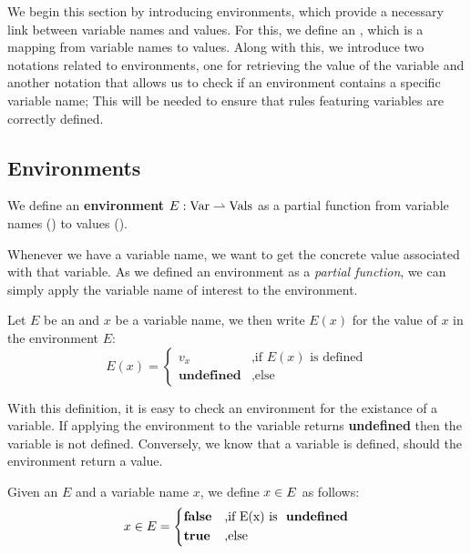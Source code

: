 We begin this section by introducing environments, which provide a necessary link between variable names and values. For this, we define an , which is a mapping from variable names to values. Along with this, we introduce two notations related to environments, one for retrieving the value of the variable and another notation that allows us to check if an environment contains a specific variable name; This will be needed to ensure that rules featuring variables are correctly defined.

\subsection{Environments}

\begin{definition}[Environment]\label{def:environment}
   We define an \textbf{environment} \(E: \text{\Var} \partialto \text{\Vals}\) as a partial function from variable names (\Var) to values (\Vals). 
\end{definition}

Whenever we have a variable name, we want to get the concrete value associated with that variable. As we defined an environment as a \emph{partial function}, we can simply apply the variable name of interest to the environment.

\begin{definition}\label{def:environment-getter}	
   Let \(E\) be an  and \(x\) be a variable name, we then write \(E(x)\) for the value of \(x\) in the environment \(E\):
   \[
      E(x) =
      \begin{cases}
	 v_x		    & \mbox{,if } E(x) \text{ is defined} \\
	 \textbf{undefined} &\mbox{,else}
      \end{cases}
   \]
\end{definition}

With this definition, it is easy to check an environment for the existance of a variable. If applying the environment to the variable returns \textbf{undefined} then the variable is not defined. Conversely, we know that a variable is defined, should the environment return a value.

\begin{definition}\label{def:in-environment}
   Given an  \(E\) and a variable name \(x\), we define \(\contains{E}{x}\) as follows:
   \[
      \contains{E}{x} = 
      \begin{cases*}
	 \false & \mbox{,if E(x) is } \textbf{undefined}\\
	 \true & \mbox{,else} 
      \end{cases*}
   \]
\end{definition}

